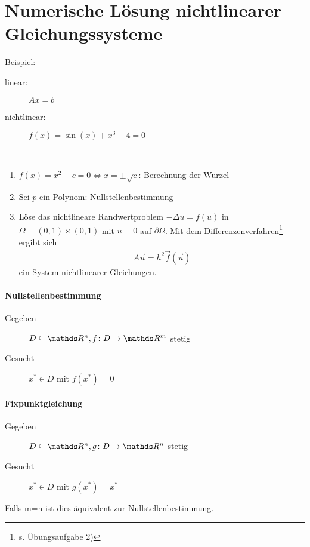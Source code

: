 % 
% 
% 
% 


\chapter{Numerische Lösung nichtlinearer Gleichungssysteme}
Beispiel:
\begin{description}
\item[linear:] $Ax=b$
\item[nichtlinear:] $f(x) = \sin(x) +x^3-4=0$
\end{description}

\begin{Bspe}~
  \begin{enumerate}[1)]
  \item $f(x) = x^2-c = 0 \Leftrightarrow x= \pm \sqrt{c}$: Berechnung der Wurzel
  \item Sei $p$ ein Polynom: Nullstellenbestimmung
  \item Löse das nichtlineare Randwertproblem $-\Delta u = f(u)$
    in $\Omega=(0,1)\times (0,1)$ mit $u=0$ auf $\partial \Omega$.
    Mit dem Differenzenverfahren\footnote{s. Übungsaufgabe 2)}
    ergibt sich
    \begin{gather*}
      A\vec{u} = h^2 \vec{f}(\vec{u})
    \end{gather*}
    ein System nichtlinearer Gleichungen.
  \end{enumerate}
\end{Bspe}

\subsubsection{Nullstellenbestimmung}
\begin{description}
\item[Gegeben]   $D\subseteq \R^n, f\colon D\to \R^m$ stetig
\item[Gesucht]    $x^{*}\in D $ mit $f(x^{*}) = 0$
\end{description}

\subsubsection{Fixpunktgleichung}
\begin{description}
\item[Gegeben]   $D\subseteq \R^n, g\colon D\to \R^n$ stetig
\item[Gesucht]      $x^{*}\in D $ mit $g(x^{*}) = x^{*}$
\end{description}
Falls m=n ist dies äquivalent zur Nullstellenbestimmung.

